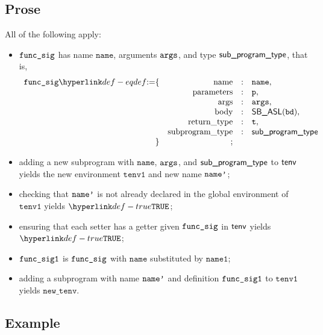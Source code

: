 \documentclass{book}
\newcommand\ProseOrTypeError[0]{\ProseTerminateAs{\TypeErrorConfig}}
\newcommand\newtenv[0]{\texttt{new\_tenv}}
\newcommand\tenvone[0]{\texttt{tenv1}}
\newcommand\vp[0]{\texttt{p}}
\newcommand\vt[0]{\texttt{t}}
\newcommand\nameone[0]{\texttt{name1}}
\newcommand\name[0]{\texttt{name}}
\begin{document}
\subsection{Prose}
All of the following apply:
\begin{itemize}
  \item $\texttt{func\_sig}$ has name $\name$, arguments $\texttt{args}$, and type $\textsf{sub\_program\_type}$, that is,
  \[
    \begin{array}{rrcl}
      \funcsig \eqdef \{
                      & \funcname            &:& \name,\\
                      & \funcparameters      &:& \vp,\\
                      & \funcargs            &:& \vargs,\\
                      & \funcbody            &:& \SBASL(\bd),\\
                      & \funcreturntype      &:& \vt,\\
                      & \funcsubprogramtype  &:& \subprogramtype \\
                  \}  & ; &&
        \end{array}
  \]
  \item adding a new subprogram with $\name$, $\texttt{args}$, and $\textsf{sub\_program\_type}$ to $\textsf{tenv}$ yields the new
        environment $\tenvone$ and new name $\texttt{name'}$\ProseOrTypeError;
  \item checking that $\texttt{name'}$ is not already declared in the global environment of $\tenvone$
        yields $\True$\ProseOrTypeError;
  \item ensuring that each setter has a getter given $\texttt{func\_sig}$ in $\textsf{tenv}$ yields $\True$\ProseOrTypeError;
  \item $\texttt{func\_sig1}$ is $\texttt{func\_sig}$ with $\name$ substituted by $\nameone$;
  \item adding a subprogram with name $\texttt{name'}$ and definition $\texttt{func\_sig1}$ to $\tenvone$ yields $\newtenv$\ProseOrTypeError.
\end{itemize}

\subsection{Example}

\end{document}

